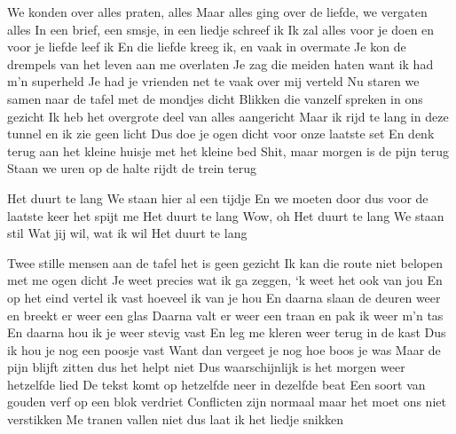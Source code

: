\begin{verse*}
We konden over alles praten, alles
Maar alles ging over de liefde, we vergaten alles
In een brief, een smsje, in een liedje schreef ik
Ik zal alles voor je doen en voor je liefde leef ik
En die liefde kreeg ik, en vaak in overmate
Je kon de drempels van het leven aan me overlaten
Je zag die meiden haten want ik had m’n superheld
Je had je vrienden net te vaak over mij verteld
Nu staren we samen naar de tafel met de mondjes dicht
Blikken die vanzelf spreken in ons gezicht
Ik heb het overgrote deel van alles aangericht
Maar ik rijd te lang in deze tunnel en ik zie geen licht
Dus doe je ogen dicht voor onze laatste set
En denk terug aan het kleine huisje met het kleine bed
Shit, maar morgen is de pijn terug
Staan we uren op de halte rijdt de trein terug
\end{verse*}

\begin{chorus}
Het duurt te lang
We staan hier al een tijdje
En we moeten door dus voor de laatste keer het spijt me
Het duurt te lang
Wow, oh
Het duurt te lang
We staan stil
Wat jij wil, wat ik wil
Het duurt te lang
\end{chorus}

\begin{verse*}
Twee stille mensen aan de tafel het is geen gezicht
Ik kan die route niet belopen met me ogen dicht
Je weet precies wat ik ga zeggen, ‘k weet het ook van jou
En op het eind vertel ik vast hoeveel ik van je hou
En daarna slaan de deuren weer en breekt er weer een glas
Daarna valt er weer een traan en pak ik weer m’n tas
En daarna hou ik je weer stevig vast
En leg me kleren weer terug in de kast
Dus ik hou je nog een poosje vast
Want dan vergeet je nog hoe boos je was
Maar de pijn blijft zitten dus het helpt niet
Dus waarschijnlijk is het morgen weer hetzelfde lied
De tekst komt op hetzelfde neer in dezelfde beat
Een soort van gouden verf op een blok verdriet
Conflicten zijn normaal maar het moet ons niet verstikken
Me tranen vallen niet dus laat ik het liedje snikken
\end{verse*}

\thechorus